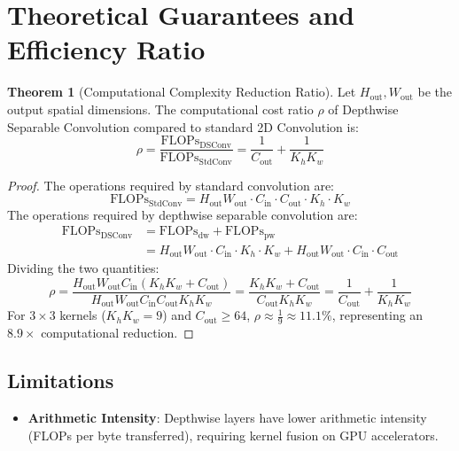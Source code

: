 \documentclass[11pt,a4paper]{article}
\theoremstyle{definition}
\newtheorem{theorem}{Theorem}[section]
\begin{document}
\section{Theoretical Guarantees and Efficiency Ratio}

\begin{theorem}[Computational Complexity Reduction Ratio]
Let $H_{\text{out}}, W_{\text{out}}$ be the output spatial dimensions. The computational cost ratio $\rho$ of Depthwise Separable Convolution compared to standard 2D Convolution is:
\begin{equation}
\rho = \frac{\text{FLOPs}_{\text{DSConv}}}{\text{FLOPs}_{\text{StdConv}}} = \frac{1}{C_{\text{out}}} + \frac{1}{K_h K_w}
\end{equation}
\end{theorem}

\begin{proof}
The operations required by standard convolution are:
\begin{equation}
\text{FLOPs}_{\text{StdConv}} = H_{\text{out}} W_{\text{out}} \cdot C_{\text{in}} \cdot C_{\text{out}} \cdot K_h \cdot K_w
\end{equation}
The operations required by depthwise separable convolution are:
\begin{align}
\text{FLOPs}_{\text{DSConv}} &= \text{FLOPs}_{\text{dw}} + \text{FLOPs}_{\text{pw}} \\
&= H_{\text{out}} W_{\text{out}} \cdot C_{\text{in}} \cdot K_h \cdot K_w + H_{\text{out}} W_{\text{out}} \cdot C_{\text{in}} \cdot C_{\text{out}}
\end{align}
Dividing the two quantities:
\begin{equation}
\rho = \frac{H_{\text{out}} W_{\text{out}} C_{\text{in}} (K_h K_w + C_{\text{out}})}{H_{\text{out}} W_{\text{out}} C_{\text{in}} C_{\text{out}} K_h K_w} = \frac{K_h K_w + C_{\text{out}}}{C_{\text{out}} K_h K_w} = \frac{1}{C_{\text{out}}} + \frac{1}{K_h K_w}
\end{equation}
For $3 \times 3$ kernels ($K_h K_w = 9$) and $C_{\text{out}} \ge 64$, $\rho \approx \frac{1}{9} \approx 11.1\%$, representing an $8.9\times$ computational reduction.
\end{proof}

\subsection{Limitations}
\begin{itemize}
    \item \textbf{Arithmetic Intensity}: Depthwise layers have lower arithmetic intensity (FLOPs per byte transferred), requiring kernel fusion on GPU accelerators.
\end{itemize}
\end{document}
